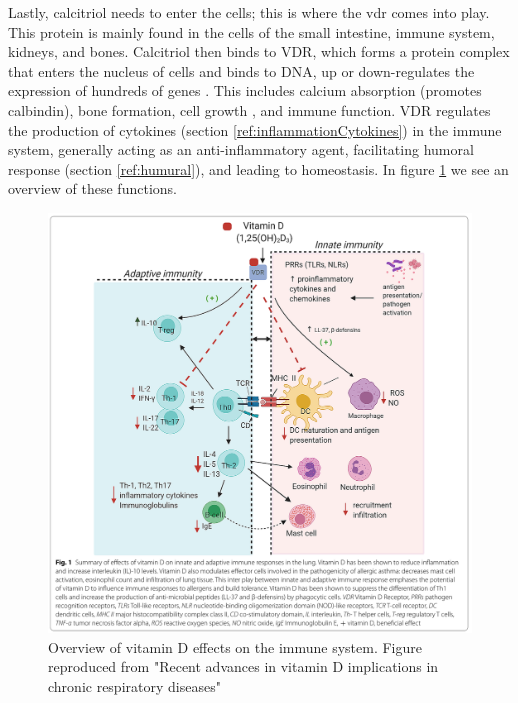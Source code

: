 Lastly, calcitriol needs to enter the cells; this is where the \gls{vdr} comes into play. This protein is mainly found in the cells of the small intestine, immune system, kidneys, and bones. Calcitriol then binds to VDR, which forms a protein complex that enters the nucleus of cells and binds to DNA, up or down-regulates the expression of hundreds of genes \cite{Nagpal2005, Dusso2005}. This includes calcium absorption (promotes calbindin), bone formation, cell growth \cite{Samuel2008}, and immune function. VDR regulates the production of cytokines (section \ref{ref:inflammationCytokines}) in the immune system, generally acting as an anti-inflammatory agent, facilitating humoral response (section \ref{ref:humural}), and leading to homeostasis. In figure \ref{fig:vitVDRimmune} we see an overview of these functions.

\begin{figure}[h!]
{
    \centering
    \includegraphics[width=1\textwidth]{figures/Vitamin D/VDRImmunity.png}
    \caption{Overview of vitamin D effects on the immune system. Figure reproduced from "Recent advances in vitamin D implications in chronic respiratory diseases" \cite{Gaudet2022}} 
    \label{fig:vitVDRimmune}
}
\medskip
\end{figure}


